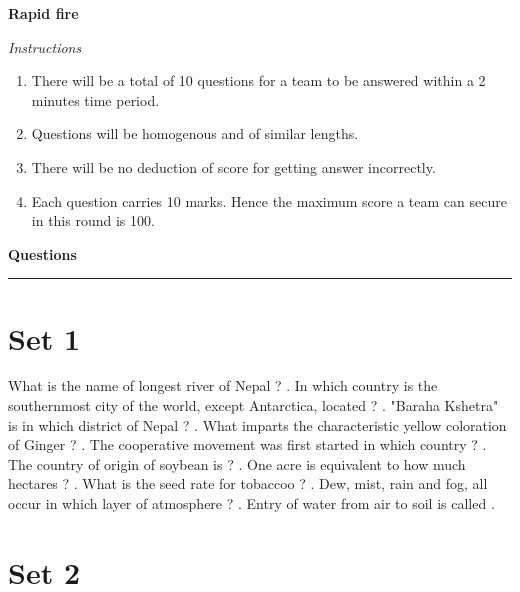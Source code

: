 \documentclass[10pt,a4paper,answers]{exam}
\begin{document}
\begin{center}
{\textbf {\LARGE Rapid fire}}
\end{center}

{\Large
\textit{Instructions}
}

\begin{enumerate}
  \item There will be a total of 10 questions for a team to be answered within a 2 minutes time period. 
  \item Questions will be homogenous and of similar lengths.
  \item There will be no deduction of score for getting answer incorrectly.
  \item Each question carries 10 marks. Hence the maximum score a team can secure in this round is 100. 
\end{enumerate}

\vspace{1cm}

{\Large \textbf{Questions} \\[1.5mm] 
\hrule
}

\section*{Set 1}

\begin{questions}
\question What is the name of longest river of Nepal ? \fillin[Karnali][3cm].
\question In which country is the southernmost city of the world, except Antarctica, located ? \fillin[Chile][3cm].
\question "Baraha Kshetra" is in which district of Nepal ? \fillin[Sunsari][3cm]. 
\question What imparts the characteristic yellow coloration of Ginger ? \fillin[Curcumin][3cm].
\question The cooperative movement was first started in which country ? \fillin[England][3cm].
\question The country of origin of soybean is ? \fillin[China][3cm].
\question One acre is equivalent to how much hectares ? \fillin[0.404][3cm].
\question What is the seed rate for tobaccoo ? \fillin[2-3 kg per ha][3cm].
\question Dew, mist, rain and fog, all occur in which layer of atmosphere ? \fillin[Trophosphere][3cm].
\question Entry of water from air to soil is called \fillin[Infilteration][3cm].
\end{questions}

\section*{Set 2}
\end{document}
